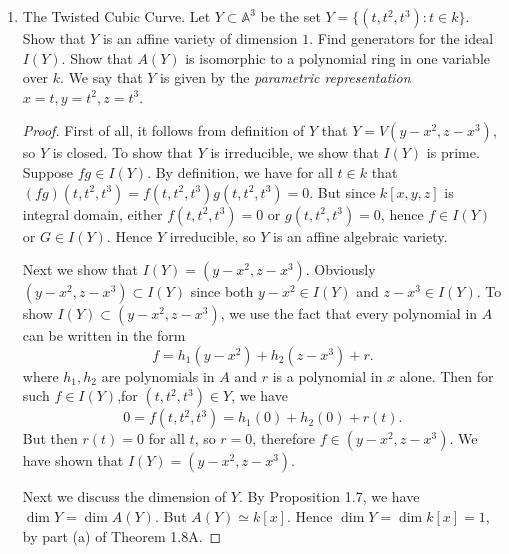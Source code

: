 \begin{enumerate}
\begin{proof}
\begin{enumerate}
\[					.\] 
					We verify that their compositions are identities:
					\begin{gather}
						\phi \circ \varphi(X') = \phi(p x) = p^{-1} (p X') = X'\\
						\phi \circ \varphi(Y') = \phi(y) = Y'\\
						\varphi \circ \phi(x) = \varphi(p^{-1} X') = p(p^{-1} x) = x \\
						\varphi \circ \phi(y) = \varphi(Y') =  y
					.\end{gather}
					Therefore $A(W)$ and $A(Z)$ are isomorphic.
			\end{enumerate}
		\end{proof}
	\item [1.2]
			The Twisted Cubic Curve. Let $Y \subset \mathbb{A}^3$ be the set $Y = \{(t,t^2, t^3): t \in k\} $. Show that $Y$ is an affine variety of dimension $1$. Find generators for the ideal $I(Y)$. Show that $A(Y)$ is isomorphic to a polynomial ring in one variable over $k$. We say that $Y$ is given by the \textit{parametric representation} $x = t, y = t^2, z = t^3$.

			 \begin{proof}
				 First of all, it follows from definition of $Y$ that $Y = V(y - x^2, z -  x^3)$, so $Y$ is closed. To show that $Y$ is irreducible, we show that $I(Y)$ is prime. Suppose $fg \in I(Y)$. By definition, we have for all $t \in k$ that $(fg)(t, t^2, t^3) = f(t, t^2, t^3)g(t, t^2, t^3) = 0$. But since $k[x,y,z]$ is integral domain, either $f(t, t^2, t^3)  = 0$ or $g(t, t^2, t^3) = 0$, hence $f \in I(Y)$ or $G \in I(Y)$. Hence $Y$ irreducible, so $Y$ is an affine algebraic variety.

				 Next we show that $I(Y) = (y - x^2, z - x^3)$. Obviously $(y - x^2, z - x^3) \subset I(Y)$ since both  $y - x^2 \in I(Y)$ and $z - x^3 \in I(Y)$. To show $I(Y) \subset (y - x^2, z - x^3)$, we use the fact that every polynomial in $A$ can be written in the form
				 \[
				 	f=h_1\left(y-x^2\right)+h_2\left(z-x^3\right)+r
				 .\] 
				 where $h_1, h_2$ are polynomials in $A$ and $r$ is a polynomial in $x$ alone. Then for such $f \in I(Y)$,for $(t, t^2, t^3) \in Y$, we have
				 \[
				 	0 = f(t, t^2, t^3) = h_1 (0) + h_2(0) + r(t)
				 .\] 
				 But then $r(t) = 0$ for all $t$, so $r = 0$, therefore $f \in (y - x^2, z - x^3)$. We have shown that $I(Y) = (y -x^2, z - x^3)$.

				 Next we discuss the dimension of $Y$. By Proposition 1.7, we have $\operatorname{dim} Y = \operatorname{dim} A(Y)$. But $A(Y) \simeq k[x]$. Hence $\operatorname{dim} Y = \operatorname{dim} k[x] = 1$, by part (a) of Theorem 1.8A.


\end{proof}
\end{enumerate}
